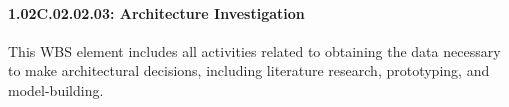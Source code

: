 \paragraph*{1.02C.02.02.03: Architecture Investigation}

This WBS element includes all activities related to obtaining the data
necessary to make architectural decisions, including literature research,
prototyping, and model-building.
